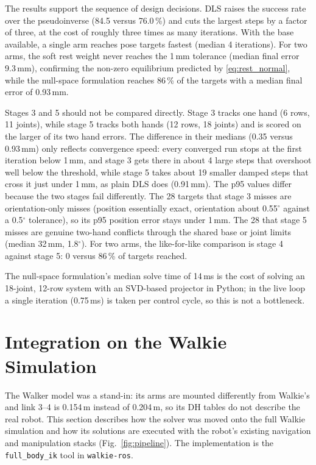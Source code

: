 \documentclass[12pt,a4paper]{article}
\begin{document}
The results support the sequence of design decisions. DLS raises the success rate over the
pseudoinverse (84.5 versus 76.0\,\%) and cuts the largest steps by a factor of three, at the cost of
roughly three times as many iterations. With the base available, a single arm reaches pose targets
fastest (median 4 iterations). For two arms, the soft rest weight never reaches the 1\,mm tolerance
(median final error 9.3\,mm), confirming the non-zero equilibrium predicted by
\eqref{eq:rest_normal}, while the null-space formulation reaches 86\,\% of the targets with a median
final error of 0.93\,mm.

Stages 3 and 5 should not be compared directly. Stage 3 tracks one hand (6 rows, 11 joints), while
stage 5 tracks both hands (12 rows, 18 joints) and is scored on the larger of its two hand errors. The difference in
their medians (0.35 versus 0.93\,mm) only reflects convergence speed: every converged run stops at the
first iteration below 1\,mm, and stage 3 gets there in about 4 large steps that overshoot well below
the threshold, while stage 5 takes about 19 smaller damped steps that cross it just under 1\,mm, as
plain DLS does (0.91\,mm). The p95 values differ because the two stages fail differently. The 28
targets that stage 3 misses are orientation-only misses (position essentially exact, orientation about
0.55$^\circ$ against a 0.5$^\circ$ tolerance), so its p95 position error stays under 1\,mm. The 28 that stage
5 misses are genuine two-hand conflicts through the shared base or joint limits (median 32\,mm,
1.8$^\circ$). For two arms, the like-for-like comparison is stage 4 against stage 5: 0 versus 86\,\% of
targets reached.

The null-space formulation's median solve time of 14\,ms is the cost of solving an 18-joint,
12-row system with an SVD-based projector in Python; in the live loop a single iteration (0.75\,ms) is
taken per control cycle, so this is not a bottleneck.

\section{Integration on the Walkie Simulation}
\label{sec:walkie}

The Walker model was a stand-in: its arms are mounted differently from Walkie's and link 3--4 is
0.154\,m instead of 0.204\,m, so its DH tables do not describe the real robot. This section describes
how the solver was moved onto the full Walkie simulation and how its solutions are executed with the
robot's existing navigation and manipulation stacks (Fig.~\ref{fig:pipeline}). The implementation is
the \texttt{full\_body\_ik} tool in \texttt{walkie-ros}.
\end{document}
